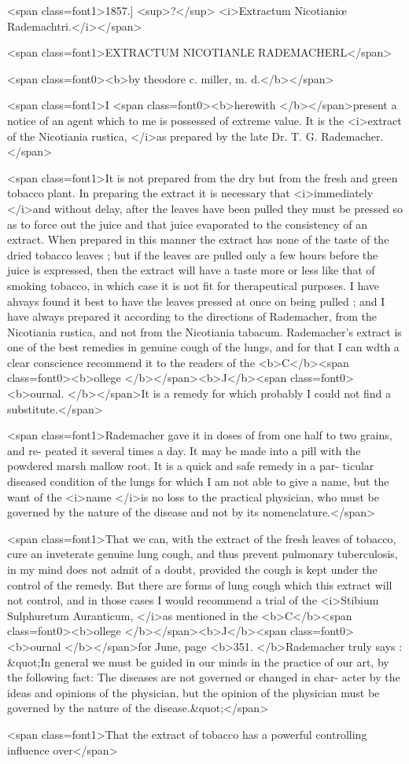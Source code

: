 <span class=font1>1857.]     <sup>?</sup>     <i>Extractum Nicotianiœ Rademachtri.</i></span>

<span class=font1>EXTRACTUM NICOTIANLE RADEMACHERL</span>

<span class=font0><b>by theodore c. miller, m. d.</b></span>

<span class=font1>I <span class=font0><b>herewith </b></span>present a notice of an agent which to me is possessed of
extreme value. It is the <i>extract of the Nicotiania rustica, </i>as prepared
by the late Dr. T. G. Rademacher.</span>

<span class=font1>It is not prepared from the dry but from the fresh and green tobacco
plant. In preparing the extract it is necessary that <i>immediately </i>and
without delay, after the leaves have been pulled they must be pressed
so as to force out the juice and that juice evaporated to the consistency
of an extract. When prepared in this manner the extract has none of
the taste of the dried tobacco leaves ; but if the leaves are pulled only
a few hours before the juice is expressed, then the extract will have a
taste more or less like that of smoking tobacco, in which case it is not
fit for therapeutical purposes. I have ahvays found it best to have the
leaves pressed at once on being pulled ; and I have always prepared it
according to the directions of Rademacher, from the Nicotiania rustica,
and not from the Nicotiania tabacum. Rademacher's extract is one of
the best remedies in genuine cough of the lungs, and for that I can wdth
a clear conscience recommend it to the readers of the <b>C</b><span class=font0><b>ollege </b></span><b>J</b><span class=font0><b>ournal.
</b></span>It is a remedy for which probably I could not find a substitute.</span>

<span class=font1>Rademacher gave it in doses of from one half to two grains, and re-
peated it several times a day. It may be made into a pill with the
powdered marsh mallow root. It is a quick and safe remedy in a par-
ticular diseased condition of the lungs for which I am not able to give
a name, but the want of the <i>name </i>is no loss to the practical physician,
who must be governed by the nature of the disease and not by its
nomenclature.</span>

<span class=font1>That we can, with the extract of the fresh leaves of tobacco, cure an
inveterate genuine lung cough, and thus prevent pulmonary tuberculosis,
in my mind does not admit of a doubt, provided the cough is kept under
the control of the remedy. But there are forms of lung cough which
this extract will not control, and in those cases I would recommend a
trial of the <i>Stibium Sulphuretum Auranticum, </i>as mentioned in the
<b>C</b><span class=font0><b>ollege </b></span><b>J</b><span class=font0><b>ournal </b></span>for June, page <b>351. </b>Rademacher truly says : &quot;In
general we must be guided in our minds in the practice of our art, by
the following fact: The diseases are not governed or changed in char-
acter by the ideas and opinions of the physician, but the opinion of
the physician must be governed by the nature of the disease.&quot;</span>

<span class=font1>That the extract of tobacco has a powerful controlling influence over</span>
